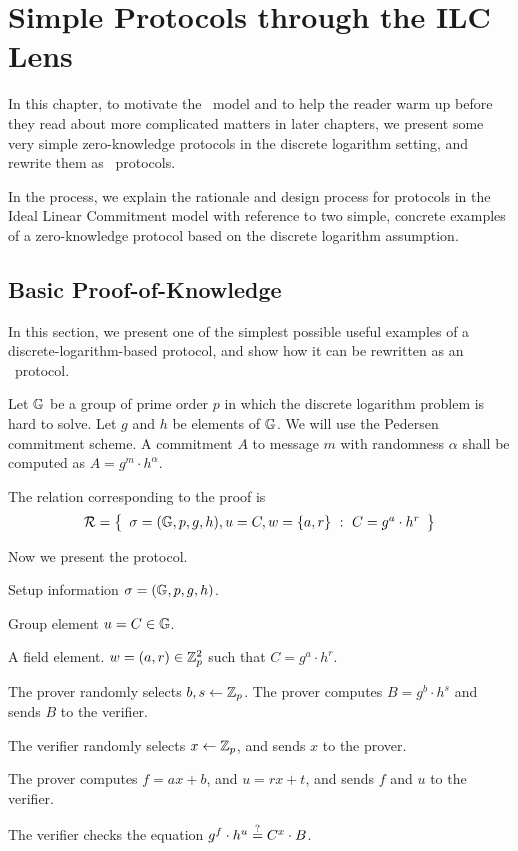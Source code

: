 \chapter{Simple Protocols through the ILC Lens}
\label{chapterlabel:Baby-Protocols}

In this chapter, to motivate the \ILC\ model and to help the reader warm up before they read about more complicated matters in later chapters, we present some very simple zero-knowledge protocols in the discrete logarithm setting, and rewrite them as \ILC\ protocols.

In the process, we explain the rationale and design process for protocols in the Ideal Linear Commitment model with reference to two simple, concrete examples of a zero-knowledge protocol based on the discrete logarithm assumption.

\section{Basic Proof-of-Knowledge}\label{sec:schnorr}

In this section, we present one of the simplest possible useful examples of a discrete-logarithm-based protocol, and show how it can be rewritten as an \ILC\ protocol.

Let $\mathbb{G}$ be a group of prime order $p$ in which the discrete logarithm problem is hard to solve. Let $g$ and $h$ be elements of $\mathbb{G}$. We will use the Pedersen commitment scheme. A commitment $A$ to message $m$ with randomness $\alpha$ shall be computed as $A = g^m \cdot h^\alpha$.

The relation corresponding to the proof is
\[
\mathcal{R} =\left\{\begin{array}{c}
\mathsf{\sigma} = (\mathbb{G},p,g,h), 
u = C,
w = \lbrace a,r \rbrace \ : \
C = g^a \cdot h^r
\end{array}\right\}
\]

Now we present the protocol.

\begin{description}\label{prot:schnorr}
\item[Common input:] Setup information $\mathsf{\sigma} = (\mathbb{G},p,g,h)$.
\item [Instance:] Group element $u = C \in \mathbb{G}$.
\item[Prover's witness:] A field element. $w = (a,r) \in \mathbb{Z}^2_p$ such that $C = g^a \cdot h^r$.
\item[Protocol:]
\item[\ P:] The prover randomly selects $b,s \gets \mathbb{Z}_p$. The prover computes $B = g^b \cdot h^s$ and sends $B$ to the verifier.

\item[\ V:] The verifier randomly selects $x\gets \mathbb{Z}_p$, and sends $x$ to the prover.

\item[\ P:] The prover computes $f = ax + b$, and $u = rx + t$, and sends $f$ and $u$ to the verifier.

\item[\ V:] The verifier checks the equation $g^f \cdot h^u \overset{?}{=} C^x \cdot B$.
\end{description}

